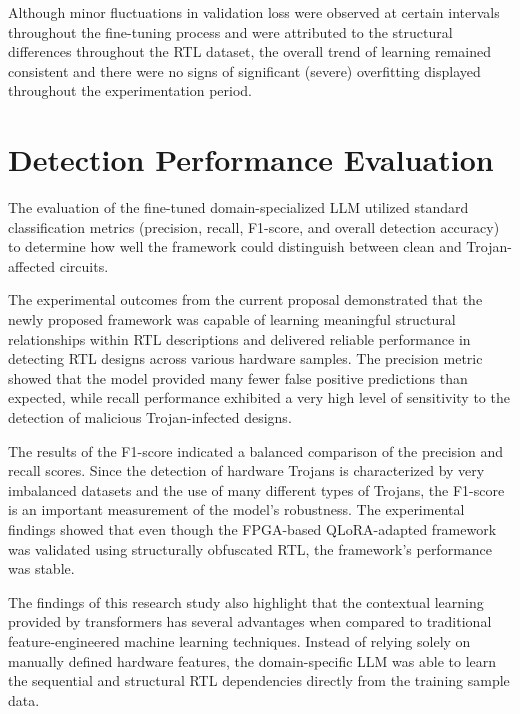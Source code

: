 \documentclass[12pt,a4paper]{report}
\begin{document}
Although minor fluctuations in validation loss were observed at certain intervals throughout the fine-tuning process and were attributed to the structural differences throughout the RTL dataset, the overall trend of learning remained consistent and there were no signs of significant (severe) overfitting displayed throughout the experimentation period.


\section{Detection Performance Evaluation}

The evaluation of the fine-tuned domain-specialized LLM utilized standard classification metrics (precision, recall, F1-score, and overall detection accuracy) \cite{ref1,ref3} to determine how well the framework could distinguish between clean and Trojan-affected circuits.

The experimental outcomes from the current proposal demonstrated that the newly proposed framework was capable of learning meaningful structural relationships within RTL descriptions and delivered reliable performance in detecting RTL designs across various hardware samples. The precision metric showed that the model provided many fewer false positive predictions than expected, while recall performance exhibited a very high level of sensitivity to the detection of malicious Trojan-infected designs.

The results of the F1-score indicated a balanced comparison of the precision and recall scores. Since the detection of hardware Trojans is characterized by very imbalanced datasets and the use of many different types of Trojans, the F1-score is an important measurement of the model's robustness. The experimental findings showed that even though the FPGA-based QLoRA-adapted framework was validated using structurally obfuscated RTL, the framework's performance was stable.

The findings of this research study also highlight that the contextual learning provided by transformers has several advantages when compared to traditional feature-engineered machine learning techniques. Instead of relying solely on manually defined hardware features, the domain-specific LLM was able to learn the sequential and structural RTL dependencies directly from the training sample data.

\end{document}

